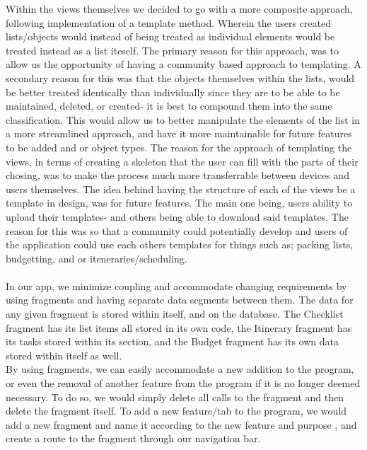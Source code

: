 \documentclass[12pt]{article}
\begin{document}
	Within the views themselves we decided to go with a more composite approach, following implementation of a template method. Wherein the users created lists/objects would instead of being treated as
	individual elements would be treated instead as a list iteself. The primary reason for this approach, was to allow us the opportunity of having a community based approach to templating.
	A secondary reason for this was that the objects themselves within the lists, would be better treated identically than individually since they are to be able to be maintained,
	deleted, or created- it is best to compound them into the same classification. This would allow us to better manipulate the elements of the list in a more streamlined approach,
	and have it more maintainable for future features to be added and or object types. The reason for the approach of templating the views, in terms of creating a skeleton that the user can
	fill with the parts of their chosing, was to make the process much more transferrable between devices and users themselves. The idea behind having the structure of each of the views
	be a template in design, was for future features. The main one being, users ability to upload their templates- and others being able to download said templates. The reason for this was
	so that a community could potentially develop and users of the application could use each others templates for things such as; packing lists, budgetting, and or iteneraries/scheduling.\\
	\\

	In our app, we minimize coupling and accommodate changing requirements by using fragments and having separate data segments between them.
	The data for any given fragment is stored within itself, and on the database.
	The Checklist fragment has its list items all stored in its own code, the Itinerary fragment has its tasks stored within its section, and the Budget fragment has its own data stored within itself as well.\\


	By using fragments, we can easily accommodate a new addition to the program, or even the removal of another feature from the program if it is no longer deemed necessary.
	To do so, we would simply delete all calls to the fragment and then delete the fragment itself.
	To add a new feature/tab to the program, we would add a new fragment and name it according to the new feature and purpose , and create a route to the fragment through our navigation bar.\\
\end{document}
